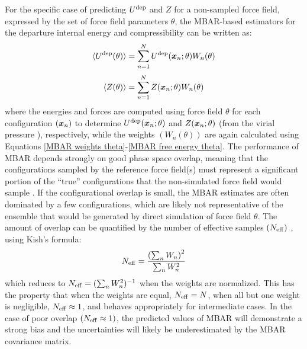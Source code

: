 \documentclass[11pt,a4paper]{article}
\newcommand{\bfv}[1]{{\mbox{\boldmath{$#1$}}}}
\newcommand{\x}{\bfv{x}}
\begin{document}
For the specific case of predicting $U^{\rm dep}$ and $Z$ for a non-sampled force field, expressed by the set of force field parameters $\theta$, the MBAR-based estimators for the departure internal energy and compressibility can be written as:
\begin{eqnarray} \label{MBAR U theta}
\langle U^{\rm dep}(\theta)\rangle = \sum_{n=1}^{N} U^{\rm dep}(\x_{n};\theta) W_{n}(\theta) 
\end{eqnarray}
\begin{eqnarray} \label{MBAR Z theta}
\langle Z(\theta)\rangle = \sum_{n=1}^{N} Z(\x_{n};\theta) W_{n}(\theta) 
\end{eqnarray}
where the energies and forces are computed using force field $\theta$ for each configuration $(\x_{n})$ to determine $U^{\rm dep}(\x_{n};\theta)$ and $Z(\x_{n};\theta)$ (from the virial pressure \cite{Allen1987}), respectively, while the weights $(W_n(\theta))$ are again calculated using Equations \ref{MBAR weights theta}-\ref{MBAR free energy theta}.
The performance of MBAR depends strongly on good phase space overlap, meaning that the configurations sampled by the reference force field(s) must represent a significant portion of the ``true'' configurations that the non-simulated force field would sample \cite{naden:jctc:2016}. If the configurational overlap is small, the MBAR estimates are often dominated by a few configurations, which are likely not representative of the ensemble that would be generated by direct simulation of force field $\theta$. The amount of overlap can be quantified by the number of effective samples $(N_{\rm eff})$ \cite{Dybeck2016}, using Kish's formula:
\begin{eqnarray} \label{Neff}
N_{\rm eff} = \frac{\left(\sum_n W_n\right)^2}{\sum_n W_n^2}
\end{eqnarray}
which reduces to $N_{\rm eff} = (\sum_n W_n^2)^{-1}$ when the weights are
normalized. This has the property that when the weights are equal,
$N_{\rm eff} = N$, when all but one weight is negligible, $N_{\rm eff} \approx
1$, and behaves appropriately for intermediate cases. 
In the case of poor overlap $(N_{\rm eff} \approx 1)$, the predicted values of MBAR will demonstrate a strong bias and the uncertainties will likely be underestimated by the MBAR covariance matrix. 
\end{document}

